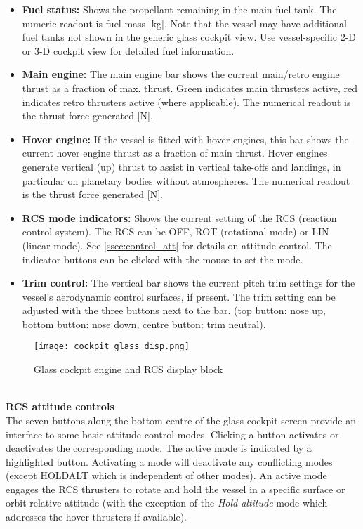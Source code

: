 \documentclass[Orbiter User Manual.tex]{subfiles}
\begin{document}
\begin{itemize}
\item \textbf{Fuel status:} Shows the propellant remaining in the main fuel tank. The numeric readout is fuel mass [kg]. Note that the vessel may have additional fuel tanks not shown in the generic glass cockpit view. Use vessel-specific 2-D or 3-D cockpit view for detailed fuel information.
\item \textbf{Main engine:} The main engine bar shows the current main/retro engine thrust as a fraction of max. thrust. Green indicates main thrusters active, red indicates retro thrusters active (where applicable). The numerical readout is the thrust force generated [N]. 
\item \textbf{Hover engine:} If the vessel is fitted with hover engines, this bar shows the current hover engine thrust as a fraction of main thrust. Hover engines generate vertical (up) thrust to assist in vertical take-offs and landings, in particular on planetary bodies without atmospheres. The numerical readout is the thrust force generated [N].
\item \textbf{RCS mode indicators:} Shows the current setting of the RCS (reaction control system). The RCS can be OFF, ROT (rotational mode) or LIN (linear mode). See \ref{ssec:control_att} for details on attitude control. The indicator buttons can be clicked with the mouse to set the mode.
\item \textbf{Trim control:} The vertical bar shows the current pitch trim settings for the vessel's aerodynamic control surfaces, if present. The trim setting can be adjusted with the three buttons next to the bar. (top button: nose up, bottom button: nose down, centre button: trim neutral).

\end{itemize}


\begin{figure}[H]
  \centering
  \texttt{[image: cockpit\_glass\_disp.png]}
  \caption{Glass cockpit engine and RCS display block}
\end{figure}

\noindent
\\
\textbf{RCS attitude controls}\\
The seven buttons along the bottom centre of the glass cockpit screen provide an interface to some basic attitude control modes. Clicking a button activates or deactivates the corresponding mode. The active mode is indicated by a highlighted button. Activating a mode will deactivate any conflicting modes (except HOLDALT which is independent of other modes). An active mode engages the RCS thrusters to rotate and hold the vessel in a specific surface or orbit-relative attitude (with the exception of the \textit{Hold altitude} mode which addresses the hover thrusters if available).
\end{document}
